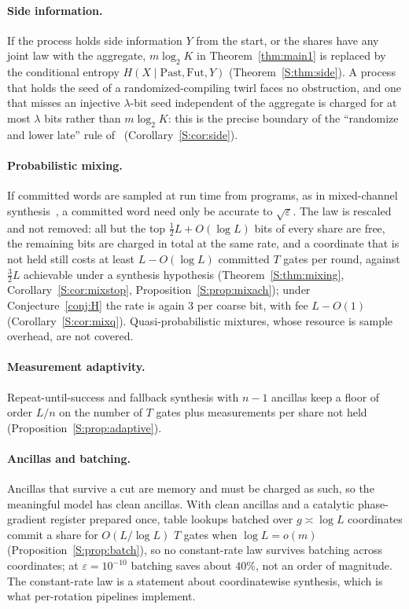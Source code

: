 \documentclass[aps,prx,twocolumn,superscriptaddress,nofootinbib,longbibliography]{revtex4-2}
\theoremstyle{plain}
\theoremstyle{definition}
\theoremstyle{remark}
\begin{document}
\paragraph{Side information.} If the process holds side information $Y$ from the start, or the shares have any joint law with the aggregate, $m\log_2K$ in Theorem~\ref{thm:main1} is replaced by the conditional entropy $H(X\mid\mathrm{Past},\mathrm{Fut},Y)$ (Theorem~\ref{S:thm:side}). A process that holds the seed of a randomized-compiling twirl faces no obstruction, and one that misses an injective $\lambda$-bit seed independent of the aggregate is charged for at most $\lambda$ bits rather than $m\log_2K$: this is the precise boundary of the ``randomize and lower late'' rule of~\cite{Paper1} (Corollary~\ref{S:cor:side}).

\paragraph{Probabilistic mixing.} If committed words are sampled at run time from programs, as in mixed-channel synthesis~\cite{Campbell17,Hastings17,KLMPP,Bothe}, a committed word need only be accurate to $\sqrt\varepsilon$. The law is rescaled and not removed: all but the top $\tfrac12L+O(\log L)$ bits of every share are free, the remaining bits are charged in total at the same rate, and a coordinate that is not held still costs at least $L-O(\log L)$ committed $T$ gates per round, against $\tfrac32L$ achievable under a synthesis hypothesis (Theorem~\ref{S:thm:mixing}, Corollary~\ref{S:cor:mixstop}, Proposition~\ref{S:prop:mixach}); under Conjecture~\ref{conj:H} the rate is again $3$ per coarse bit, with fee $L-O(1)$ (Corollary~\ref{S:cor:mixq}). Quasi-probabilistic mixtures, whose resource is sample overhead, are not covered.

\paragraph{Measurement adaptivity.} Repeat-until-success and fallback synthesis with $n-1$ ancillas keep a floor of order $L/n$ on the number of $T$ gates plus measurements per share not held (Proposition~\ref{S:prop:adaptive}).

\paragraph{Ancillas and batching.} Ancillas that survive a cut are memory and must be charged as such, so the meaningful model has clean ancillas. With clean ancillas and a catalytic phase-gradient register prepared once, table lookups batched over $g\asymp\log L$ coordinates commit a share for $O(L/\log L)$ $T$ gates when $\log L=o(m)$ (Proposition~\ref{S:prop:batch}), so no constant-rate law survives batching across coordinates; at $\varepsilon=10^{-10}$ batching saves about $40\%$, not an order of magnitude. The constant-rate law is a statement about coordinatewise synthesis, which is what per-rotation pipelines implement.
\end{document}

